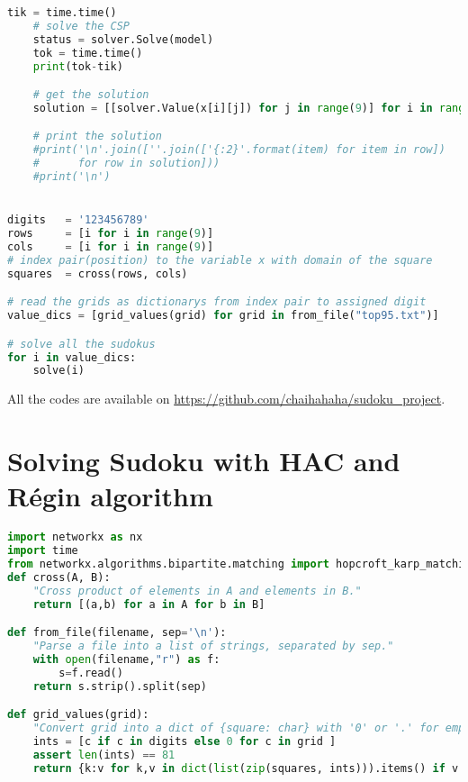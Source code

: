 \documentclass[a4paper, 12pt]{report}
\begin{document}
\begin{appendices}
\begin{lstlisting}[frame=single,language=python]
    tik = time.time()
    # solve the CSP
    status = solver.Solve(model)
    tok = time.time()
    print(tok-tik)

    # get the solution
    solution = [[solver.Value(x[i][j]) for j in range(9)] for i in range(9)]

    # print the solution
    #print('\n'.join([''.join(['{:2}'.format(item) for item in row])
    #      for row in solution]))
    #print('\n')


digits   = '123456789'
rows     = [i for i in range(9)]
cols     = [i for i in range(9)]
# index pair(position) to the variable x with domain of the square
squares  = cross(rows, cols)

# read the grids as dictionarys from index pair to assigned digit
value_dics = [grid_values(grid) for grid in from_file("top95.txt")]

# solve all the sudokus
for i in value_dics:
    solve(i)
            \end{lstlisting}
            All the codes are available on \url{https://github.com/chaihahaha/sudoku_project}.


        \chapter{Solving Sudoku with HAC and Régin algorithm}
        \label{python}
            \begin{lstlisting}[frame=single, language=python]
import networkx as nx
import time
from networkx.algorithms.bipartite.matching import hopcroft_karp_matching
def cross(A, B):
    "Cross product of elements in A and elements in B."
    return [(a,b) for a in A for b in B]

def from_file(filename, sep='\n'):
    "Parse a file into a list of strings, separated by sep."
    with open(filename,"r") as f:
        s=f.read()
    return s.strip().split(sep)

def grid_values(grid):
    "Convert grid into a dict of {square: char} with '0' or '.' for empties."
    ints = [c if c in digits else 0 for c in grid ]
    assert len(ints) == 81
    return {k:v for k,v in dict(list(zip(squares, ints))).items() if v!=0}


\end{lstlisting}
\end{appendices}
\end{document}

